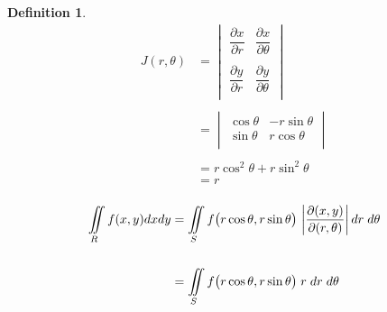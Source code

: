 \documentclass[11pt,a4paper]{article}
\theoremstyle{definition}
\newtheorem{defn}[thm]{Definition}
\begin{document}
\begin{defn}
\begin{align*}
J(r,\theta) & = \begin{vmatrix}
\dfrac{\partial x}{\partial r} & \dfrac{\partial x}{\partial \theta}\\\\
\dfrac{\partial y}{\partial r} & \dfrac{\partial y}{\partial \theta}\\
\end{vmatrix}\\\\
& = \begin{vmatrix}
\cos \theta & - r \sin \theta \\
\sin \theta & r \cos \theta \\
\end{vmatrix}\\\\
& = r \cos^2 \theta + r \sin^2 \theta\\
& = r\\
\end{align*}

\begin{align*}
\iint\limits_R f(x,y) dxdy & =  \iint\limits_S f\big( r\cos \theta , r \sin \theta \big)\, \begin{vmatrix}
\dfrac{\partial(x,y)}{\partial (r, \theta )}
\end{vmatrix}
dr\hspace{0.1cm} d\theta\\\\
& =  \iint\limits_S f\big( r\cos \theta , r \sin \theta \big)\hspace{0.1cm}r\hspace{0.1cm}dr\hspace{0.1cm}d\theta\\
\end{align*}



\end{defn}
\end{document}
